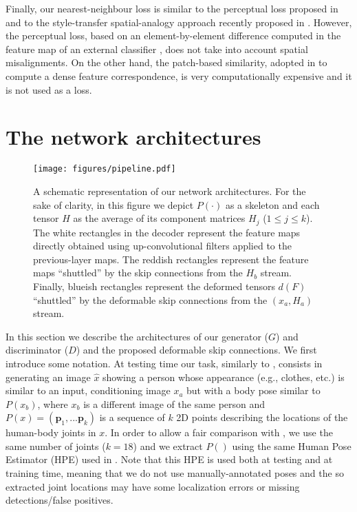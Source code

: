 \documentclass[10pt,twocolumn,letterpaper]{article}
\begin{document}
 Finally, our nearest-neighbour loss is similar to the
 perceptual loss proposed in \cite{DBLP:conf/eccv/JohnsonAF16} and to the 
  style-transfer spatial-analogy approach recently proposed in \cite{DBLP:journals/tog/LiaoYYHK17}. However, 
the perceptual loss,  based on an element-by-element difference computed in the feature map of an external classifier \cite{DBLP:conf/eccv/JohnsonAF16}, does not take into account spatial misalignments. On the other hand,   
  the patch-based similarity, adopted in \cite{DBLP:journals/tog/LiaoYYHK17} to compute a dense feature correspondence, is very computationally expensive and it is not used as a loss. 
  

 
 \section{The network architectures}
\label{architectures}

\begin{figure*}[t]\centering
\texttt{[image: figures/pipeline.pdf]}
\caption{A schematic representation of our network architectures. For the sake of clarity, in this figure we depict $P(\cdot)$ as a skeleton and each tensor $H$ as the average of its component matrices $H_j$ ($1 \leq j \leq k$). The white rectangles in the decoder represent the feature maps directly obtained using up-convolutional filters applied to the previous-layer maps. The reddish rectangles represent the feature maps ``shuttled'' by the skip connections from the $H_b$ stream. Finally, blueish rectangles represent the deformed tensors $d(F)$ ``shuttled'' by the deformable skip connections from the $(x_a,H_a)$ stream.}
\vspace{-0.5cm}
\label{fig:pipeline}
\end{figure*}

In this section we describe the architectures of our generator ($G$) and discriminator ($D$)  and the proposed deformable skip connections.  We first introduce  some notation. At testing time our task, similarly to \cite{ma2017pose}, consists in generating an image $\hat{x}$ showing a person whose appearance (e.g., clothes, etc.) is similar to an input, conditioning image $x_a$ but with a body pose similar to $P(x_b)$, where $x_b$ is a different image of the same person and $P(x) = (\mathbf{p}_1, ... \mathbf{p}_k)$ is a sequence of $k$ 2D points describing the locations of the human-body joints in $x$. 
In order to allow  a fair comparison with \cite{ma2017pose},
we use the same number  of joints ($k = 18$)
and we extract  $P()$ using the same Human Pose Estimator (HPE)  \cite{Cao} used in \cite{ma2017pose}. Note that this HPE is used both at testing and at training time, meaning that we do not use manually-annotated poses and the so extracted joint locations may have some localization errors or missing detections/false positives.
\end{document}
